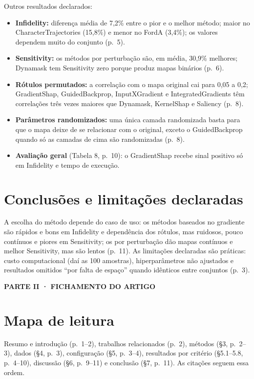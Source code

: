 \documentclass[11pt,a4paper]{article}
\newcommand{\partbar}[1]{\par\vspace{1.2em}\noindent\colorbox{black!80}{\parbox{\dimexpr\linewidth-2\fboxsep}{\color{white}\bfseries\sffamily\MakeUppercase{#1}}}\par\vspace{0.4em}}
\begin{document}
Outros resultados declarados:
\begin{itemize}
\item \textbf{Infidelity:} diferença média de 7,2\% entre o pior e o melhor método; maior no CharacterTrajectories (15,8\%) e menor no FordA (3,4\%); os valores dependem muito do conjunto (p.~5).
\item \textbf{Sensitivity:} os métodos por perturbação são, em média, 30,9\% melhores; Dynamask tem Sensitivity zero porque produz mapas binários (p.~6).
\item \textbf{Rótulos permutados:} a correlação com o mapa original cai para 0,05 a 0,2; GradientShap, GuidedBackprop, InputXGradient e IntegratedGradients têm correlações três vezes maiores que Dynamask, KernelShap e Saliency (p.~8).
\item \textbf{Parâmetros randomizados:} uma única camada randomizada basta para que o mapa deixe de se relacionar com o original, exceto o GuidedBackprop quando só as camadas de cima são randomizadas (p.~8).
\item \textbf{Avaliação geral} (Tabela 8, p.~10): o GradientShap recebe sinal positivo só em Infidelity e tempo de execução.
\end{itemize}

\section{Conclusões e limitações declaradas}
A escolha do método depende do caso de uso: os métodos baseados no gradiente são rápidos e bons em Infidelity e dependência dos rótulos, mas ruidosos, pouco contínuos e piores em Sensitivity; os por perturbação dão mapas contínuos e melhor Sensitivity, mas são lentos (p.~11). As limitações declaradas são práticas: custo computacional (daí as 100 amostras), hiperparâmetros não ajustados e resultados omitidos ``por falta de espaço'' quando idênticos entre conjuntos (p.~3).

\partbar{Parte II · Fichamento do artigo}

\section{Mapa de leitura}
Resumo e introdução (p.~1--2), trabalhos relacionados (p.~2), métodos (§3, p.~2--3), dados (§4, p.~3), configuração (§5, p.~3--4), resultados por critério (§5.1--5.8, p.~4--10), discussão (§6, p.~9--11) e conclusão (§7, p.~11). As citações seguem essa ordem.
\end{document}
